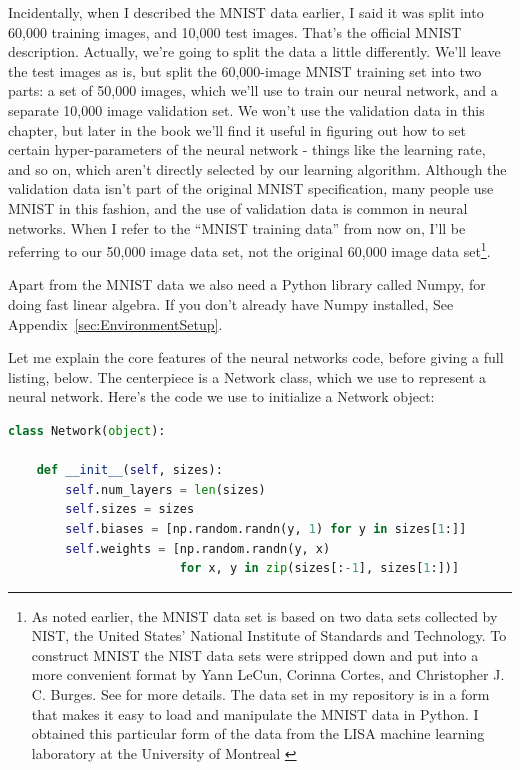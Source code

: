 Incidentally, when I described the MNIST data earlier, I said it was split into 60,000 training images, and 10,000 test images. That's the official MNIST description. Actually, we're going to split the data a little differently. We'll leave the test images as is, but split the 60,000-image MNIST training set into two parts: a set of 50,000 images, which we'll use to train our neural network, and a separate 10,000 image validation set. We won't use the validation data in this chapter, but later in the book we'll find it useful in figuring out how to set certain hyper-parameters of the neural network - things like the learning rate, and so on, which aren't directly selected by our learning algorithm. Although the validation data isn't part of the original MNIST specification, many people use MNIST in this fashion, and the use of validation data is common in neural networks. When I refer to the ``MNIST training data'' from now on, I'll be referring to our 50,000 image data set, not the original 60,000 image data set\footnote{As noted earlier, the MNIST data set is based on two data sets collected by NIST, the United States' National Institute of Standards and Technology. To construct MNIST the NIST data sets were stripped down and put into a more convenient format by Yann LeCun, Corinna Cortes, and Christopher J. C. Burges. See \cite{LeCun2019} for more details. The data set in my repository is in a form that makes it easy to load and manipulate the MNIST data in Python. I obtained this particular form of the data from the LISA machine learning laboratory at the University of Montreal \cite{LISALabGStart2019}}.

Apart from the MNIST data we also need a Python library called Numpy, for doing fast linear algebra. If you don't already have Numpy installed, See Appendix~\ref{sec:EnvironmentSetup}.

Let me explain the core features of the neural networks code, before giving a full listing, below. The centerpiece is a Network class, which we use to represent a neural network. Here's the code we use to initialize a Network object:

\begin{lstlisting}[language=Python]
class Network(object):

    def __init__(self, sizes):
        self.num_layers = len(sizes)
        self.sizes = sizes
        self.biases = [np.random.randn(y, 1) for y in sizes[1:]]
        self.weights = [np.random.randn(y, x) 
                        for x, y in zip(sizes[:-1], sizes[1:])]
\end{lstlisting}
                        
